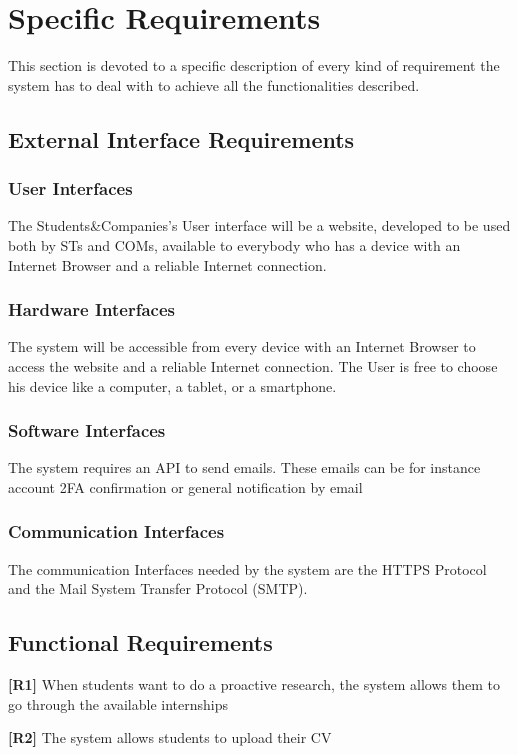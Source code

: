 
\chapter{Specific Requirements}
This section is devoted to a specific description of every kind of requirement the system has to deal with to achieve all the functionalities described.

\section{External Interface Requirements}
\subsection{User Interfaces}
The Students\&Companies's User interface will be a website, developed to be used
both by STs and COMs, available to everybody who has a device with an Internet Browser
and a reliable Internet connection.

\subsection{Hardware Interfaces}
The system will be accessible from every device with an Internet Browser to access the
website and a reliable Internet connection.  The User is free to choose his device like a computer, a tablet, or a smartphone.

\subsection{Software Interfaces}
The system requires an API to send emails. These emails can be for instance account 2FA confirmation or general notification by email
 
\subsection{Communication Interfaces}
The communication Interfaces needed by the system are the HTTPS Protocol and the
Mail System Transfer Protocol (SMTP).

\section{Functional Requirements}
\textbf{[R1]} When students want to do a proactive research, the system allows them to go through the available internships

\textbf{[R2]} The system allows students to upload their CV

